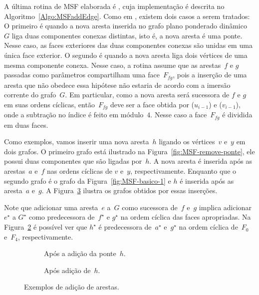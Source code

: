 A última rotina de MSF elaborada é \MSFaddEdge{}, cuja implementação é descrita no Algoritmo~\ref{Algo:MSFaddEdge}.
Como em \MSFdelEdge{}, existem dois casos a serem tratados: O primeiro é quando a nova aresta inserida no grafo plano ponderado dinâmico~$G$ liga duas componentes conexas distintas, isto é, a nova aresta é uma ponte.
Nesse caso, as faces exteriores das duas componentes conexas são unidas em uma única face exterior.
O segundo é quando a nova aresta liga dois vértices de uma mesma componente conexa.
Nesse caso, a rotina \MSFaddEdge{} assume que as arestas~$f$ e $g$ passadas como parâmetros compartilham uma face~$F_{fg}$, pois a inserção de uma aresta que não obedece essa hipótese não estaria de acordo com a imersão corrente do grafo~$G$.
Em particular, como a nova aresta será sucessora de $f$ e $g$ em suas ordens cíclicas, então~$F_{fg}$ deve ser a face obtida por \LCOFindNode($u_{i-1}$) e \LCOFindNode($v_{i-1}$), onde a subtração no índice é feito em módulo~$4$.
Nesse caso a face~$F_{fg}$ é dividida em duas faces.

Como exemplos, vamos inserir uma nova aresta~$h$ ligando os vértices~$v$ e~$y$ em dois grafos.
O primeiro grafo está ilustrado na Figura~\ref{fig:MSF-remove-ponte}, ele possui duas componentes que são ligadas por~$h$. 
A nova aresta é inserida após as arestas~$a$ e~$f$ nas ordens cíclicas de $v$ e~$y$, respectivamente.
Enquanto que o segundo grafo é o grafo da Figura~\ref{fig:MSF-basico-1} e $h$ é inserida após as aresta~$a$ e~$g$.
A Figura~\ref{fig:antes-depois-adiciona} ilustra os grafos obtidos por essas inserções.

Note que adicionar uma aresta~$e$ a~$G$ como sucessora de~$f$ e~$g$ implica adicionar $e^\star$ a $G^\star$ como predecessora de~$f^\star$ e $g^\star$ na ordem cíclica das faces apropriadas.  
Na Figura~\ref{fig:MSF-adiciona-nao-ponte} é possível ver que $h^\star$ é predecessora de~$a^\star$ e~$g^\star$ na ordem cíclica de~$F_0$ e~$F_4$, respectivamente.

\begin{figure}[htb]
\begin{subfigure}{0.45\textwidth}
\scalebox{0.7}{

}
\caption{Após a adição da ponte~$h$.}
\label{fig:MSF-adiciona-ponte}
\end{subfigure}
\begin{subfigure}{0.45\textwidth}
\scalebox{0.7}{

}
\caption{Após adição de~$h$.}
\label{fig:MSF-adiciona-nao-ponte}
\end{subfigure}
\caption{Exemplos de adição de arestas.}
\label{fig:antes-depois-adiciona}
\end{figure}


